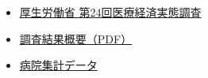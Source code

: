 \documentclass[
  a4paper,
  a4paper,
  11pt]{ltjsbook}
\providecommand{\tightlist}{%
  \setlength{\itemsep}{0pt}\setlength{\parskip}{0pt}}
\begin{document}
\begin{itemize}
\tightlist
\item
  \href{https://www.e-stat.go.jp/stat-search/files?page=1&layout=datalist&toukei=00450381&tstat=000001211580&cycle=0&tclass1=000001211581&tclass2val=0}{厚生労働省
  第24回医療経済実態調査}
\item
  \href{https://www.e-stat.go.jp/stat-search/file-download?statInfId=000040121502&fileKind=2}{調査結果概要（PDF）}
\item
  \href{https://www.e-stat.go.jp/stat-search/file-download?statInfId=000040121495&fileKind=2}{病院集計データ}
\end{itemize}
\end{document}
